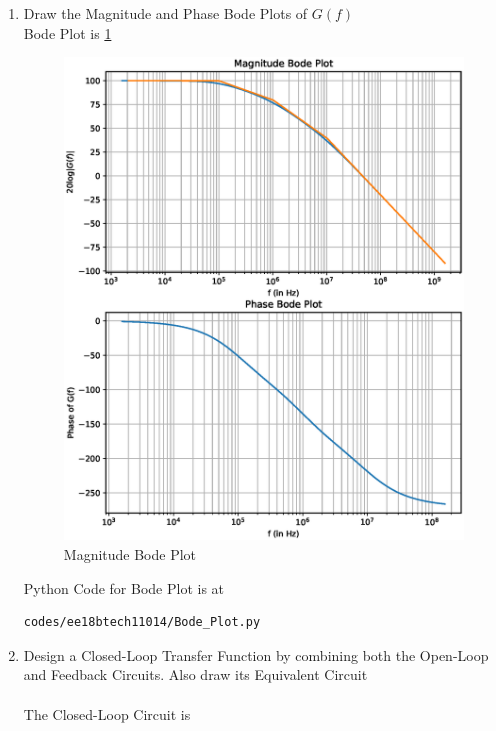\begin{enumerate}[label=\thesection.\arabic*.,ref=\thesection.\theenumi]
\item Draw the Magnitude and Phase Bode Plots of $G(f)$\\
\solution
Bode Plot is \ref{fig:Bode Plot}
\begin{figure}[ht!]
	\begin{center}
		\includegraphics[width=\columnwidth]{./figs/ee18btech11014/Bode_Plot.eps}
	\end{center}
	\caption{Magnitude Bode Plot}
	\label{fig:Bode Plot}
\end{figure}

Python Code for Bode Plot is at
\begin{lstlisting}
codes/ee18btech11014/Bode_Plot.py
\end{lstlisting}

\item  Design a Closed-Loop Transfer Function by combining both the Open-Loop and Feedback Circuits. Also draw its Equivalent Circuit\\
\solution\\
The Closed-Loop Circuit is
\begin{figure}[ht!]
	\begin{center}
		\resizebox{\columnwidth}{!}{}
	\end{center}
	\caption{}
	\label{fig:ee18btech11014_Closed-Loop Circuit}
\end{figure}


\end{enumerate}
